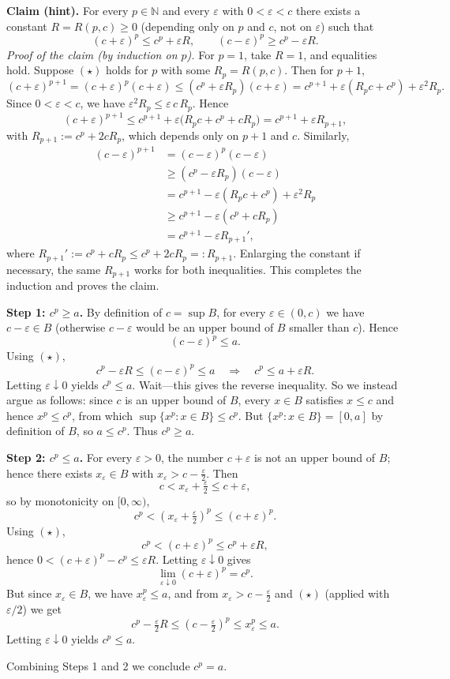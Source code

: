 \documentclass[12pt,a4paper]{article}
\theoremstyle{definition}
\theoremstyle{remark}
\begin{document}
\textbf{Claim (hint).} For every $p\in\mathbb{N}$ and every $\varepsilon$ with $0<\varepsilon<c$ there exists a constant $R=R(p,c)\ge0$ (depending only on $p$ and $c$, not on $\varepsilon$) such that
\[
(c+\varepsilon)^p\le c^p+\varepsilon R,\qquad (c-\varepsilon)^p\ge c^p-\varepsilon R.
\tag{$\star$}
\]
\emph{Proof of the claim (by induction on $p$).}
For $p=1$, take $R=1$, and equalities hold. Suppose $(\star)$ holds for $p$ with some $R_p=R(p,c)$. Then for $p+1$,
\[
(c+\varepsilon)^{p+1}=(c+\varepsilon)^p(c+\varepsilon)
\le (c^p+\varepsilon R_p)(c+\varepsilon)
= c^{p+1}+\varepsilon(R_pc+c^p)+\varepsilon^2R_p.
\]
Since $0<\varepsilon<c$, we have $\varepsilon^2R_p\le \varepsilon\,c\,R_p$. Hence
\[
(c+\varepsilon)^{p+1}\le c^{p+1}+\varepsilon\big(R_pc+c^p+cR_p\big)
= c^{p+1}+\varepsilon R_{p+1},
\]
with $R_{p+1}:=c^p+2cR_p$, which depends only on $p+1$ and $c$. Similarly,
\begin{align}
(c-\varepsilon)^{p+1}
&=(c-\varepsilon)^p(c-\varepsilon)\\
&\ge (c^p-\varepsilon R_p)(c-\varepsilon)\\
&= c^{p+1}-\varepsilon(R_pc+c^p)+\varepsilon^2R_p\\
&\ge c^{p+1}-\varepsilon(c^p+cR_p)\\
&= c^{p+1}-\varepsilon R_{p+1}',
\end{align}
where $R_{p+1}':=c^p+cR_p\le c^p+2cR_p=:R_{p+1}$. Enlarging the constant if necessary, the same $R_{p+1}$ works for both inequalities. This completes the induction and proves the claim.

\medskip
\textbf{Step 1: $c^p\ge a$.}
By definition of $c=\sup B$, for every $\varepsilon\in(0,c)$ we have $c-\varepsilon\in B$ (otherwise $c-\varepsilon$ would be an upper bound of $B$ smaller than $c$). Hence
\[
(c-\varepsilon)^p\le a.
\]
Using $(\star)$,
\[
c^p-\varepsilon R\le (c-\varepsilon)^p\le a
\quad\Rightarrow\quad
c^p\le a+\varepsilon R.
\]
Letting $\varepsilon\downarrow0$ yields $c^p\le a$. Wait—this gives the reverse inequality. So we instead argue as follows: since $c$ is an upper bound of $B$, every $x\in B$ satisfies $x\le c$ and hence $x^p\le c^p$, from which $\sup\{x^p:x\in B\}\le c^p$. But $\{x^p:x\in B\}=[0,a]$ by definition of $B$, so $a\le c^p$. Thus $c^p\ge a$.

\textbf{Step 2: $c^p\le a$.}
For every $\varepsilon>0$, the number $c+\varepsilon$ is not an upper bound of $B$; hence there exists $x_\varepsilon\in B$ with $x_\varepsilon>c-\tfrac{\varepsilon}{2}$. Then
\[
c< x_\varepsilon+\tfrac{\varepsilon}{2}\le c+\varepsilon,
\]
so by monotonicity on $[0,\infty)$,
\[
c^p<(x_\varepsilon+\tfrac{\varepsilon}{2})^p\le (c+\varepsilon)^p.
\]
Using $(\star)$,
\[
c^p<(c+\varepsilon)^p\le c^p+\varepsilon R,
\]
hence $0<(c+\varepsilon)^p-c^p\le \varepsilon R$. Letting $\varepsilon\downarrow0$ gives
\[
\lim_{\varepsilon\downarrow0}(c+\varepsilon)^p=c^p.
\]
But since $x_\varepsilon\in B$, we have $x_\varepsilon^p\le a$, and from $x_\varepsilon>c-\tfrac{\varepsilon}{2}$ and $(\star)$ (applied with $\varepsilon/2$) we get
\[
c^p-\tfrac{\varepsilon}{2}R \le (c-\tfrac{\varepsilon}{2})^p
\le x_\varepsilon^p\le a.
\]
Letting $\varepsilon\downarrow0$ yields $c^p\le a$.

\medskip
Combining Steps 1 and 2 we conclude $c^p=a$.
\end{document}
